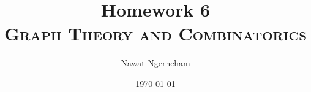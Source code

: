 \documentclass[answers]{exam}
\title{\Huge{Homework 6}
	\\
\Large\scshape{Graph Theory and Combinatorics}}
\author{Nawat Ngerncham}
\date{\today}
\begin{document}
\maketitle

\begin{questions}
  
  
\end{questions}

% 
% 
\end{document}
